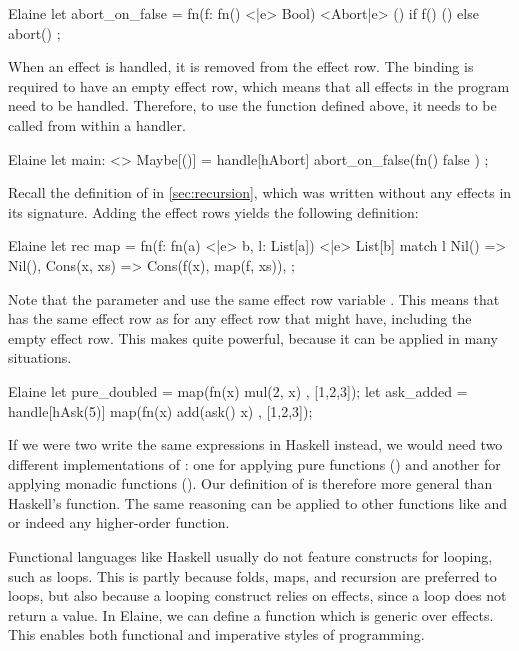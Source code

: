 \begin{lst}{Elaine}
let abort_on_false = fn(f: fn() <|e> Bool) <Abort|e> () {
    if f() { () } else { abort() }
};
\end{lst}
%
When an effect is handled, it is removed from the effect row. The  binding is required to have an empty effect row, which means that all effects in the program need to be handled. Therefore, to use the  function defined above, it needs to be called from within a handler.

\begin{lst}{Elaine}
let main: <> Maybe[()] = handle[hAbort] {
    abort_on_false(fn() { false })
};
\end{lst}
%
Recall the definition of  in \cref{sec:recursion}, which was written without any effects in its signature. Adding the effect rows yields the following definition:

\begin{lst}{Elaine}
let rec map = fn(f: fn(a) <|e> b, l: List[a]) <|e> List[b] {
    match l {
        Nil() => Nil(),
        Cons(x, xs) => Cons(f(x), map(f, xs)),
    }
};
\end{lst}
%
Note that the parameter  and  use the same effect row variable . This means that  has the same effect row as  for any effect row that  might have, including the empty effect row. This makes  quite powerful, because it can be applied in many situations.

\begin{lst}{Elaine}
let pure_doubled = map(fn(x) { mul(2, x) }, [1,2,3]);
let ask_added = handle[hAsk(5)] map(fn(x) { add(ask() x) }, [1,2,3]);
\end{lst}
%
If we were two write the same expressions in Haskell instead, we would need two different implementations of : one for applying pure functions () and another for applying monadic functions (). Our definition of  is therefore more general than Haskell's  function. The same reasoning can be applied to other functions like  and  or indeed any higher-order function.

Functional languages like Haskell usually do not feature constructs for looping, such as  loops. This is partly because folds, maps, and recursion are preferred to loops, but also because a looping construct relies on effects, since a loop does not return a value. In Elaine, we can define a  function which is generic over effects. This enables both functional and imperative styles of programming.


